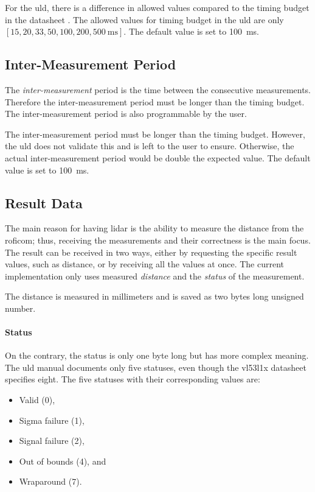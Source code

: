 \documentclass[
  digital,     %
  oneside,     %
  nosansbold,  %
  nocolorbold, %
  nolof,         %
  nolot,         %
]{fithesis4}
\begin{document}
For the \acrshort{uld}, there is a difference in allowed values compared to the timing budget in the
datasheet \cite{vl53l1x}. The allowed values for timing budget in the \acrshort{uld} are only $[15,
20, 33, 50, 100, 200, \qty{500}{\milli\second}]$. The default value is set to
\qty{100}{\milli\second}.

\subsection{ Inter-Measurement Period }
The \emph{inter-measurement} period is the time between the consecutive measurements. Therefore the
inter-measurement period must be longer than the timing budget. The inter-measurement period is also
programmable by the user.

The inter-measurement period must be longer than the timing budget. However, the \acrshort{uld} does
not validate this and is left to the user to ensure. Otherwise, the actual inter-measurement period
would be double the expected value. The default value is set to \qty{100}{\milli\second}.

\subsection{ Result Data } \label{sec:lidar-result}

The main reason for having \acrshort{lidar} is the ability to measure the distance from the
\acrshort{roficom}; thus, receiving the measurements and their correctness is the main focus. The
result can be received in two ways, either by requesting the specific result values, such as
distance, or by receiving all the values at once. The current implementation only uses measured
\emph{distance} and the \emph{status} of the measurement.

The distance is measured in millimeters and is saved as two bytes long unsigned number.

\paragraph{Status}

On the contrary, the status is only one byte long but has more complex meaning. The \acrshort{uld}
manual \cite{um2510} documents only five statuses, even though the \gls{vl53l1x} datasheet
\cite{vl53l1x} specifies eight. The five statuses with their corresponding values are:

\begin{itemize}
    \item Valid (0),
    \item Sigma failure (1),
    \item Signal failure (2),
    \item Out of bounds (4), and
    \item Wraparound (7).
\end{itemize}
\end{document}
